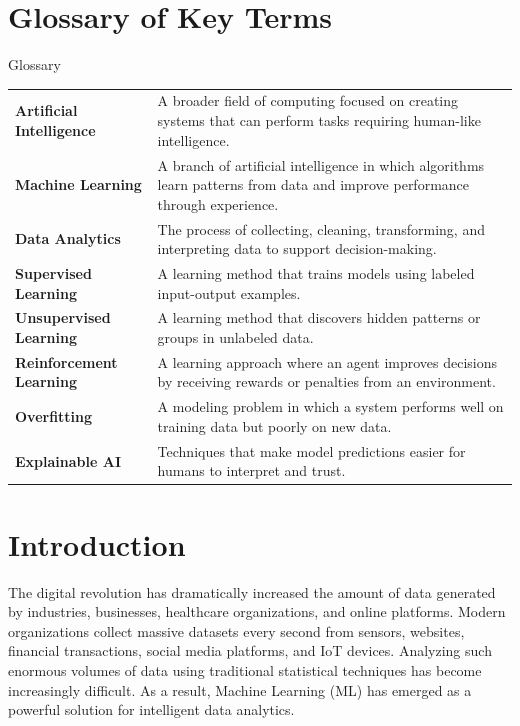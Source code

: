 \documentclass[11pt,a4paper]{article}
\newcommand{\termrow}[2]{\textbf{#1} & #2 \\}
\begin{document}
\newpage


\tableofcontents
\newpage

\listoffigures
\newpage

\section*{Glossary of Key Terms}

\begin{summarybox}{Glossary}
\renewcommand{\arraystretch}{1.35}
\small
\begin{tabular}{>{\raggedright\arraybackslash}p{3.4cm} >{\raggedright\arraybackslash}p{10.2cm}}
\termrow{Artificial Intelligence}{A broader field of computing focused on creating systems that can perform tasks requiring human-like intelligence.}
\termrow{Machine Learning}{A branch of artificial intelligence in which algorithms learn patterns from data and improve performance through experience.}
\termrow{Data Analytics}{The process of collecting, cleaning, transforming, and interpreting data to support decision-making.}
\termrow{Supervised Learning}{A learning method that trains models using labeled input-output examples.}
\termrow{Unsupervised Learning}{A learning method that discovers hidden patterns or groups in unlabeled data.}
\termrow{Reinforcement Learning}{A learning approach where an agent improves decisions by receiving rewards or penalties from an environment.}
\termrow{Overfitting}{A modeling problem in which a system performs well on training data but poorly on new data.}
\termrow{Explainable AI}{Techniques that make model predictions easier for humans to interpret and trust.}
\end{tabular}
\end{summarybox}

\newpage


\section{Introduction}

The digital revolution has dramatically increased the amount of data generated by industries, businesses, healthcare organizations, and online platforms. Modern organizations collect massive datasets every second from sensors, websites, financial transactions, social media platforms, and IoT devices. Analyzing such enormous volumes of data using traditional statistical techniques has become increasingly difficult. As a result, Machine Learning (ML) has emerged as a powerful solution for intelligent data analytics.
\end{document}
